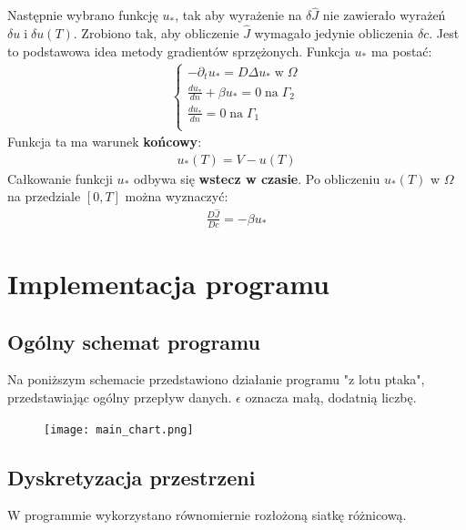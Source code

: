\documentclass{article}
\begin{document}
Następnie wybrano funkcję $u_*$, tak aby wyrażenie na $\delta\hat{J}$ nie zawierało wyrażeń $\delta u \;\text{i}\; \delta u(T)$. Zrobiono tak, aby obliczenie $\hat{J}$ wymagało jedynie obliczenia $\delta c$. Jest to podstawowa idea metody gradientów sprzężonych.
Funkcja $u_*$ ma postać:
\begin{align*}
	\begin{cases}
		-\partial_t u_* = D\Delta u_* \;\text{w}\; \Omega \\
		\frac{du_*}{dn} + \beta u_* = 0 \; \text{na} \; \Gamma_2\\
		\frac{du_*}{dn} = 0 \; \text{na} \; \Gamma_1\\
	\end{cases}
\end{align*}
Funkcja ta ma warunek \textbf{końcowy}:
\begin{align*}
	u_*(T) = V - u(T)
\end{align*}
Całkowanie funkcji $u_*$ odbywa się \textbf{wstecz w czasie}.
Po obliczeniu $u_*(T)$ w $\Omega$ na przedziale $[0, T]$ można wyznaczyć:
\begin{align*}
	\frac{D\hat{J}}{Dc} = -\beta u_*
\end{align*}
\section{Implementacja programu}
\subsection{Ogólny schemat programu}
Na poniższym schemacie przedstawiono działanie programu "z lotu ptaka", przedstawiając ogólny przepływ danych. $\epsilon$ oznacza małą, dodatnią liczbę.
\begin{figure}[H]
	\centering
	\texttt{[image: main\_chart.png]}
\end{figure}
\subsection{Dyskretyzacja przestrzeni}
W programmie wykorzystano równomiernie rozłożoną siatkę różnicową.
\end{document}
